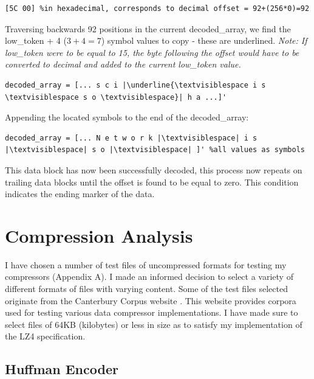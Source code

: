 \documentclass[12pt]{article}
\begin{document}
\begin{verbatim}
[5C 00] %in hexadecimal, corresponds to decimal offset = 92+(256*0)=92
\end{verbatim}

Traversing backwards 92 positions in the current decoded\_array, we find the low\_token + 4 ($3+4=7$) symbol values to copy - these are underlined. \emph{Note: If low\_token were to be equal to 15, the byte following the offset would have to be converted to decimal and added to the current low\_token value.}

\begin{verbatim}
decoded_array = [... s c i |\underline{\textvisiblespace i s \textvisiblespace s o \textvisiblespace}| h a ...]'
\end{verbatim}

Appending the located symbols to the end of the decoded\_array:

\begin{verbatim}
decoded_array = [... N e t w o r k |\textvisiblespace| i s |\textvisiblespace| s o |\textvisiblespace| ]' %all values as symbols 
\end{verbatim}

This data block has now been successfully decoded, this process now repeats on trailing data blocks until the offset is found to be equal to zero. This condition indicates the ending marker of the data.

\clearpage
\section{Compression Analysis}

I have chosen a number of test files of uncompressed formats for testing my compressors (Appendix A). I made an informed decision to select a variety of different formats of files with varying content. Some of the test files selected originate from the Canterbury Corpus website \citep{canterbury_corpus}. This website provides corpora used for testing various data compressor implementations. I have made sure to select files of 64KB (kilobytes) or less in size as to satisfy my implementation of the LZ4 specification.
\subsection{Huffman Encoder}
\end{document}
